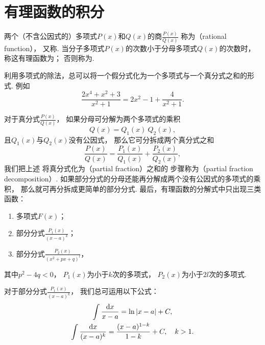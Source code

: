 \section{有理函数的积分}
两个（不含公因式的）多项式\(P(x)\)和\(Q(x)\)的商\(\frac{P(x)}{Q(x)}\)
称为（rational function），
又称.
当分子多项式\(P(x)\)的次数小于分母多项式\(Q(x)\)的次数时，
称这有理函数为；
否则称为.

利用多项式的除法，总可以将一个假分式化为一个多项式与一个真分式之和的形式.
例如\begin{equation*}
	\frac{2x^4+x^2+3}{x^2+1}
	= 2x^2-1+\frac{4}{x^2+1}.
\end{equation*}

对于真分式\(\frac{P(x)}{Q(x)}\)，
如果分母可分解为两个多项式的乘积\begin{equation*}
	Q(x) = Q_1(x)~Q_2(x),
\end{equation*}
且\(Q_1(x)\)与\(Q_2(x)\)没有公因式，
那么它可分拆成两个真分式之和\begin{equation*}
	\frac{P(x)}{Q(x)} = \frac{P_1(x)}{Q_1(x)} + \frac{P_2(x)}{Q_2(x)},
\end{equation*}
我们把上述
将真分式化为（partial fraction）之和的
步骤称为（partial fraction decomposition）.
如果部分分式的分母还能再分解成两个没有公因式的多项式的乘积，
那么就可再分拆成更简单的部分分式.
最后，有理函数的分解式中只出现三类函数：
\begin{enumerate}
	\item 多项式\(F(x)\)；
	\item 部分分式\(\frac{P_1(x)}{(x-a)^k}\)；
	\item 部分分式\(\frac{P_2(x)}{(x^2+px+q)^l}\)，
\end{enumerate}
其中\(p^2-4q<0\)，
\(P_1(x)\)为小于\(k\)次的多项式，
\(P_2(x)\)为小于\(2l\)次的多项式.

对于部分分式\(\frac{P_1(x)}{(x-a)^k}\)，
我们总可运用以下公式：\begin{gather*}
	\int \frac{\dd{x}}{x-a} = \ln\abs{x-a} + C, \\
	\int \frac{\dd{x}}{(x-a)^k} = \frac{(x-a)^{1-k}}{1-k} + C,
	\quad k>1.
\end{gather*}

